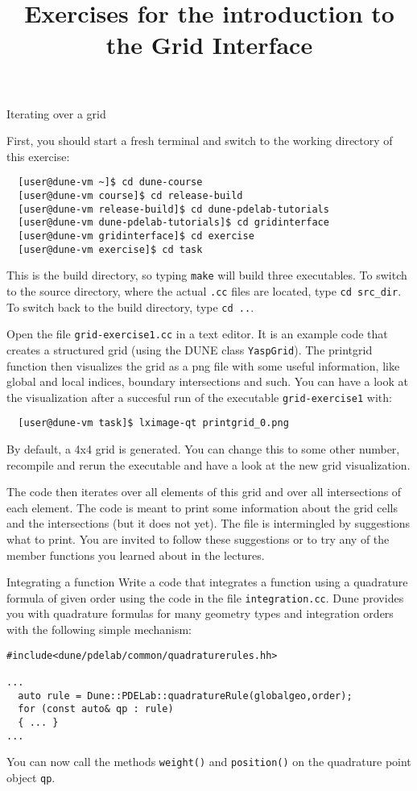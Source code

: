\documentclass[12pt,a4paper]{article}
\title{\textbf{Exercises for the introduction to the Grid Interface}}
\begin{document}
\exerciseheader

\begin{Exercise}{Iterating over a grid}

First, you should start a fresh terminal and switch to the working directory of this exercise:
\begin{lstlisting}
  [user@dune-vm ~]$ cd dune-course
  [user@dune-vm course]$ cd release-build
  [user@dune-vm release-build]$ cd dune-pdelab-tutorials
  [user@dune-vm dune-pdelab-tutorials]$ cd gridinterface
  [user@dune-vm gridinterface]$ cd exercise
  [user@dune-vm exercise]$ cd task
\end{lstlisting}

This is the build directory, so typing \lstinline!make! will build three executables.
To switch to the source directory, where the actual \lstinline!.cc! files are located, type \lstinline!cd src_dir!.
To switch back to the build directory, type \lstinline!cd ..!.

Open the file \texttt{grid-exercise1.cc} in a text editor.  It is an
example code that creates a structured grid (using the DUNE class
\texttt{YaspGrid}). The printgrid function then visualizes the grid
as a png file with some useful information, like global and local
indices, boundary intersections and such. You can have a look at the
visualization after a succesful run of the executable \lstinline!grid-exercise1!
with:

\begin{lstlisting}
  [user@dune-vm task]$ lximage-qt printgrid_0.png
\end{lstlisting}%

By default, a 4x4 grid is generated. You can change this to some
other number, recompile and rerun the executable and have a look at
the new grid visualization.

The code then iterates over all elements of this grid and
over all intersections of each element.  The code is meant to print
some information about the grid cells and the intersections (but it
does not yet).  The file is intermingled by suggestions what to print.
You are invited to follow these suggestions or to try any of the
member functions you learned about in the lectures.
\end{Exercise}

\begin{Exercise}{Integrating a function}
 Write a code that integrates a function using a quadrature formula of
 given order using the code in the file \lstinline!integration.cc!.
 Dune provides you with quadrature formulas for many geometry types and integration orders
 with the following simple mechanism:

\begin{lstlisting}
#include<dune/pdelab/common/quadraturerules.hh>

...
  auto rule = Dune::PDELab::quadratureRule(globalgeo,order);
  for (const auto& qp : rule)
  { ... }
...
\end{lstlisting}
 You can now call the methods \verb!weight()! and \verb!position()! on the quadrature
 point object \verb!qp!.
\end{Exercise}
\end{document}
